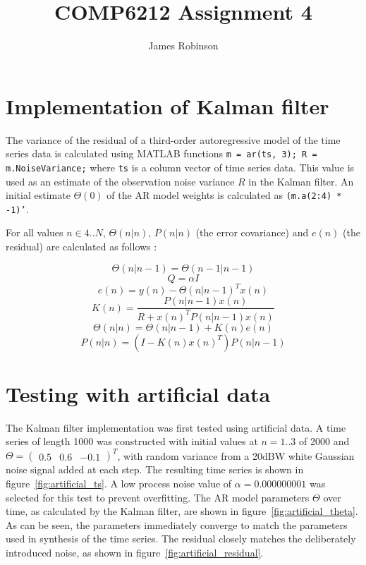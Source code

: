 \documentclass[12pt]{article}
\title{COMP6212 Assignment 4}
\author{James Robinson}
\begin{document}
  \maketitle

  \section{Implementation of Kalman filter}

  The variance of the residual of a third-order autoregressive model of the time series data is calculated using MATLAB functions \texttt{m = ar(ts, 3); R = m.NoiseVariance;} where \texttt{ts} is a column vector of time series data. This value is used as an estimate of the observation noise variance $R$ in the Kalman filter. An initial estimate $\Theta(0)$ of the AR model weights is calculated as \texttt{(m.a(2:4) * -1)'}.

  For all values $n \in 4..N$, $\Theta(n | n)$, $P(n | n)$ (the error covariance) and $e(n)$ (the residual) are calculated as follows \cite{Kalman1960}:

  \begin{equation}
    \Theta(n | n - 1) = \Theta(n - 1 | n - 1)
  \end{equation}
  \begin{equation}
    Q = \alpha I
  \end{equation}
  \begin{equation}
    e(n) = y(n) - \Theta(n | n - 1)^T x(n)
  \end{equation}
  \begin{equation}
    K(n) = \frac{P(n | n - 1)x(n)}{R + x(n)^T P(n|n - 1) x(n)}
  \end{equation}
  \begin{equation}
    \Theta(n|n) = \Theta(n | n - 1) + K(n) e(n)
  \end{equation}
  \begin{equation}
    P(n | n) = (I - K(n)x(n)^T)P(n | n - 1)
  \end{equation}

  \section{Testing with artificial data}

  The Kalman filter implementation was first tested using artificial data. A time series of length 1000 was constructed with initial values at $n = 1..3$ of 2000 and $\Theta = \left(\begin{matrix}0.5 & 0.6 & -0.1\end{matrix}\right)^T$, with random variance from a 20dBW white Gaussian noise signal added at each step. The resulting time series is shown in figure~\ref{fig:artificial_ts}. A low process noise value of $\alpha = 0.000000001$ was selected for this test to prevent overfitting. The AR model parameters $\Theta$ over time, as calculated by the Kalman filter, are shown in figure~\ref{fig:artificial_theta}. As can be seen, the parameters immediately converge to match the parameters used in synthesis of the time series. The residual closely matches the deliberately introduced noise, as shown in figure~\ref{fig:artificial_residual}.
\end{document}
